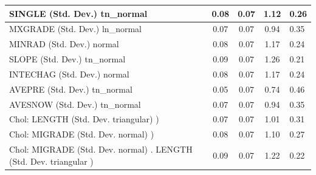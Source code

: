 \begin{table}
\begin{center}
\begin{tabular}{|l|l|c|c|c|l|}
			SINGLE (Std. Dev.) tn_normal &  & 0.08 & 0.07 & 1.12 & 0.26 \\
			\hline
			MXGRADE (Std. Dev.) ln_normal &  & 0.07 & 0.07 & 0.94 & 0.35 \\
			\hline
			MINRAD (Std. Dev.) normal &  & 0.08 & 0.07 & 1.17 & 0.24 \\
			\hline
			SLOPE (Std. Dev.) tn_normal &  & 0.09 & 0.07 & 1.26 & 0.21 \\
			\hline
			INTECHAG (Std. Dev.) normal &  & 0.08 & 0.07 & 1.17 & 0.24 \\
			\hline
			AVEPRE (Std. Dev.) tn_normal &  & 0.05 & 0.07 & 0.74 & 0.46 \\
			\hline
			AVESNOW (Std. Dev.) tn_normal &  & 0.07 & 0.07 & 0.94 & 0.35 \\
			\hline
			 Chol: LENGTH (Std. Dev. triangular) ) &  & 0.07 & 0.07 & 1.01 & 0.31 \\
			\hline
			 Chol: MIGRADE (Std. Dev. normal) ) &  & 0.08 & 0.07 & 1.10 & 0.27 \\
			\hline
			 Chol: MIGRADE (Std. Dev. normal) . LENGTH (Std. Dev.   triangular ) &  & 0.09 & 0.07 & 1.22 & 0.22 \\
			\hline
		\end{tabular}
	\end{center}
\end{table}